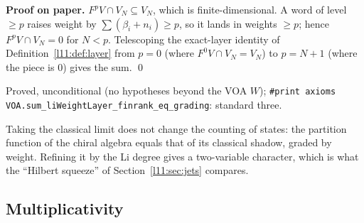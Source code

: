 \textbf{Proof on paper.} $F^pV\cap V_N\subseteq V_N$, which is finite-dimensional. A word of level $\ge p$
raises weight by $\sum(\beta_i+n_i)\ge p$, so it lands in weights $\ge p$; hence $F^pV\cap V_N = 0$ for
$N<p$. Telescoping the exact-layer identity of Definition~\ref{l11:def:layer} from $p=0$ (where
$F^0V\cap V_N = V_N$) to $p=N+1$ (where the piece is $0$) gives the sum. \qed

\begin{status}
Proved, unconditional (no hypotheses beyond the VOA $W$); \texttt{\#print axioms
VOA.sum\_liWeightLayer\_finrank\_eq\_grading}: standard three.
\end{status}

\begin{physics}
Taking the classical limit does not change the counting of states: the partition function of the chiral
algebra equals that of its classical shadow, graded by weight. Refining it by the Li degree gives a
two-variable character, which is what the ``Hilbert squeeze'' of Section~\ref{l11:sec:jets} compares.
\end{physics}

\subsection{Multiplicativity}

